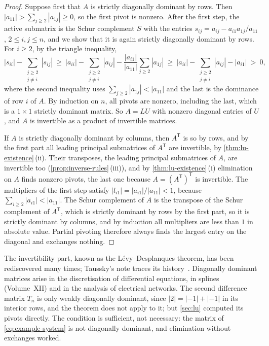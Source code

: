 \begin{proof}
Suppose first that $A$ is strictly diagonally dominant by rows. Then $|a_{11}|>\sum_{j\ge2}|a_{1j}|\ge0$, so the first pivot is nonzero. After the first step, the active submatrix is the Schur complement $S$ with the entries $s_{ij}=a_{ij}-a_{i1}a_{1j}/a_{11}$, $2\le i,j\le n$, and we show that it is again strictly diagonally dominant by rows. For $i\ge2$, by the triangle inequality,
\[
|s_{ii}|-\sum_{\substack{j\ge2\\j\ne i}}|s_{ij}|\ \ge\ |a_{ii}|-\sum_{\substack{j\ge2\\j\ne i}}|a_{ij}|-\frac{|a_{i1}|}{|a_{11}|}\sum_{j\ge2}|a_{1j}|\ \ge\ |a_{ii}|-\sum_{\substack{j\ge2\\j\ne i}}|a_{ij}|-|a_{i1}|\ >\ 0,
\]
where the second inequality uses $\sum_{j\ge2}|a_{1j}|<|a_{11}|$ and the last is the dominance of row $i$ of $A$. By induction on $n$, all pivots are nonzero, including the last, which is a $1\times1$ strictly dominant matrix. So $A=LU$ with nonzero diagonal entries of $U$, and $A$ is invertible as a product of invertible matrices.

If $A$ is strictly diagonally dominant by columns, then $A^{\mathsf T}$ is so by rows, and by the first part all leading principal submatrices of $A^{\mathsf T}$ are invertible, by \cref{thm:lu-existence}\,(ii). Their transposes, the leading principal submatrices of $A$, are invertible too (\cref{prop:inverse-rules}\,(iii)), and by \cref{thm:lu-existence}\,(i) elimination on $A$ finds nonzero pivots, the last one because $A=(A^{\mathsf T})^{\mathsf T}$ is invertible. The multipliers of the first step satisfy $|l_{i1}|=|a_{i1}|/|a_{11}|<1$, because $\sum_{i\ge2}|a_{i1}|<|a_{11}|$. The Schur complement of $A$ is the transpose of the Schur complement of $A^{\mathsf T}$, which is strictly dominant by rows by the first part, so it is strictly dominant by columns, and by induction all multipliers are less than $1$ in absolute value. Partial pivoting therefore always finds the largest entry on the diagonal and exchanges nothing.
\end{proof}

The invertibility part, known as the L\'evy--Desplanques theorem, has been rediscovered many times; Taussky's note traces its history~\cite{taussky1949}. Diagonally dominant matrices arise in the discretisation of differential equations, in splines (Volume~XII) and in the analysis of electrical networks. The second difference matrix $T_n$ is only weakly diagonally dominant, since $|2|=|-1|+|-1|$ in its interior rows, and the theorem does not apply to it; but \cref{sec:lu} computed its pivots directly. The condition is sufficient, not necessary: the matrix of \eqref{eq:example-system} is not diagonally dominant, and elimination without exchanges worked.

